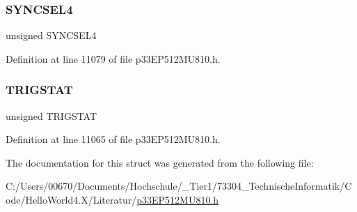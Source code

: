 \subsubsection{\texorpdfstring{S\+Y\+N\+C\+S\+E\+L4}{SYNCSEL4}}
{\footnotesize\ttfamily unsigned S\+Y\+N\+C\+S\+E\+L4}



Definition at line 11079 of file p33\+E\+P512\+M\+U810.\+h.

\mbox{\label{structtag_o_c1_c_o_n2_b_i_t_s_ab379549de54ac93ad4aa73686c34cb7c}} 
\subsubsection{\texorpdfstring{T\+R\+I\+G\+S\+T\+AT}{TRIGSTAT}}
{\footnotesize\ttfamily unsigned T\+R\+I\+G\+S\+T\+AT}



Definition at line 11065 of file p33\+E\+P512\+M\+U810.\+h.



The documentation for this struct was generated from the following file\+:\begin{DoxyCompactItemize}
\item 
C\+:/\+Users/00670/\+Documents/\+Hochschule/\+\_\+\+Tier1/73304\+\_\+\+Technische\+Informatik/\+Code/\+Hello\+World4.\+X/\+Literatur/\hyperlink{p33_e_p512_m_u810_8h}{p33\+E\+P512\+M\+U810.\+h}\end{DoxyCompactItemize}
